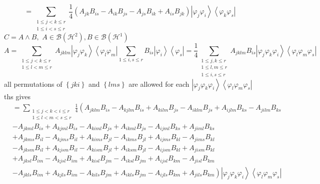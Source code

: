 \documentclass[aps,preprint]{revtex4}%
\begin{document}
\begin{equation}
=\sum_{\substack{1\leq j<k\leq r\\1\leq i<s\leq r}}\frac{1}{4}\left(
A_{jk}B_{is}-A_{ik}B_{js}-A_{js}B_{ik}+A_{is}B_{jk}\right)  \left\vert
\varphi_{j}\varphi_{i}\right\rangle \left\langle \varphi_{k}\varphi
_{s}\right\vert
\end{equation}
$C=A\wedge B,$ $A\in\mathcal{B}\left(  \mathcal{H}^{2}\right)  ,B\in
\mathcal{B}\left(  \mathcal{H}^{1}\right)  $%
\begin{equation}
A=\sum_{\substack{1\leq j<k\leq r\\1\leq l<m\leq r}}A_{jklm}\left\vert
\varphi_{j}\varphi_{k}\right\rangle \left\langle \varphi_{l}\varphi
_{m}\right\vert \sum_{1\leq i,s\leq r}B_{is}\left\vert \varphi_{i}%
\right\rangle \left\langle \varphi_{s}\right\vert =\frac{1}{4}\sum
_{\substack{1\leq j,k\leq r\\1\leq l,m\leq r\\1\leq i,s\leq r}}A_{jklm}%
B_{is}\left\vert \varphi_{j}\varphi_{k}\varphi_{i}\right\rangle \left\langle
\varphi_{l}\varphi_{m}\varphi_{s}\right\vert
\end{equation}
all permutations of $\left\{  jki\right\}  $ and $\left\{  lms\right\}  $ are
allowed for each $\left\vert \varphi_{j}\varphi_{k}\varphi_{i}\right\rangle
\left\langle \varphi_{l}\varphi_{m}\varphi_{s}\right\vert $ ths gives
\begin{align}
&  =\sum_{\substack{1\leq j<k<i\leq r\\1\leq l<m<s\leq r}}\frac{1}{4}\left(
A_{jklm}B_{is}-A_{kjlm}B_{is}+A_{kilm}B_{js}-A_{iklm}B_{js}+A_{ijlm}%
B_{ks}-A_{jilm}B_{ks}\right. \nonumber\\
&  -A_{jkml}B_{is}+A_{kjml}B_{is}-A_{kiml}B_{js}+A_{ikml}B_{js}-A_{ijml}%
B_{ks}+A_{jiml}B_{ks}\nonumber\\
&  +A_{jkms}B_{il}-A_{kjms}B_{il}+A_{kims}B_{jl}-A_{ikms}B_{jl}+A_{ijms}%
B_{kl}-A_{jims}B_{kl}\nonumber\\
&  -A_{jksm}B_{il}+A_{kjsm}B_{il}-A_{kism}B_{jl}+A_{iksm}B_{jl}-A_{ijsm}%
B_{kl}+A_{jism}B_{kl}\nonumber\\
&  +A_{jksl}B_{im}-A_{kjsl}B_{im}+A_{kisl}B_{jm}-A_{iksl}B_{jm}+A_{ijsl}%
B_{km}-A_{jisl}B_{km}\nonumber\\
&  -\left.  A_{jkls}B_{im}+A_{kjls}B_{im}-A_{kils}B_{jm}+A_{ikls}%
B_{jm}-A_{ijls}B_{km}+A_{jils}B_{km}\right)  \left\vert \varphi_{j}\varphi
_{k}\varphi_{i}\right\rangle \left\langle \varphi_{l}\varphi_{m}\varphi
_{s}\right\vert
\end{align}
\end{document}
